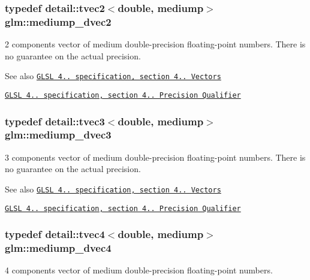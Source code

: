\subsubsection[{\texorpdfstring{mediump\+\_\+dvec2}{mediump_dvec2}}]{\setlength{\rightskip}{0pt plus 5cm}typedef detail\+::tvec2$<$double, mediump$>$ {\bf glm\+::mediump\+\_\+dvec2}}\hypertarget{group__core__precision_gace1f1cc2eb8e978dcb60e682af87b541}{}\label{group__core__precision_gace1f1cc2eb8e978dcb60e682af87b541}
2 components vector of medium double-\/precision floating-\/point numbers. There is no guarantee on the actual precision.

\begin{DoxySeeAlso}{See also}
\href{http://www.opengl.org/registry/doc/GLSLangSpec.4.20.8.pdf}{\tt G\+L\+SL 4.. specification, section 4.. Vectors} 

\href{http://www.opengl.org/registry/doc/GLSLangSpec.4.20.8.pdf}{\tt G\+L\+SL 4.. specification, section 4.. Precision Qualifier} 
\end{DoxySeeAlso}
\subsubsection[{\texorpdfstring{mediump\+\_\+dvec3}{mediump_dvec3}}]{\setlength{\rightskip}{0pt plus 5cm}typedef detail\+::tvec3$<$double, mediump$>$ {\bf glm\+::mediump\+\_\+dvec3}}\hypertarget{group__core__precision_gac051f0702cb0e717db5dd913f6261388}{}\label{group__core__precision_gac051f0702cb0e717db5dd913f6261388}
3 components vector of medium double-\/precision floating-\/point numbers. There is no guarantee on the actual precision.

\begin{DoxySeeAlso}{See also}
\href{http://www.opengl.org/registry/doc/GLSLangSpec.4.20.8.pdf}{\tt G\+L\+SL 4.. specification, section 4.. Vectors} 

\href{http://www.opengl.org/registry/doc/GLSLangSpec.4.20.8.pdf}{\tt G\+L\+SL 4.. specification, section 4.. Precision Qualifier} 
\end{DoxySeeAlso}
\subsubsection[{\texorpdfstring{mediump\+\_\+dvec4}{mediump_dvec4}}]{\setlength{\rightskip}{0pt plus 5cm}typedef detail\+::tvec4$<$double, mediump$>$ {\bf glm\+::mediump\+\_\+dvec4}}\hypertarget{group__core__precision_gac61cf2fc2df895e5f277c978dace042a}{}\label{group__core__precision_gac61cf2fc2df895e5f277c978dace042a}
4 components vector of medium double-\/precision floating-\/point numbers.

